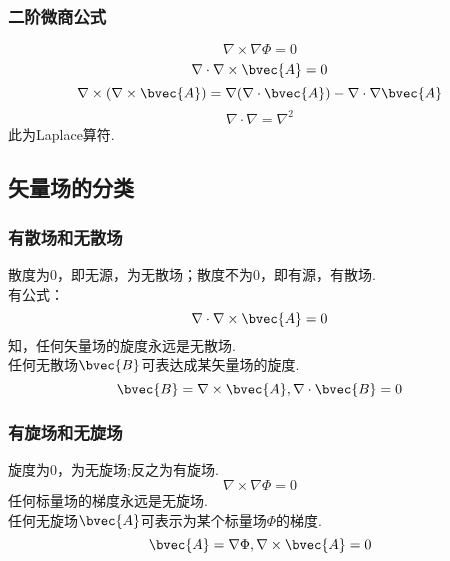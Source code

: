 \subsubsection{二阶微商公式}
\begin{equation}\label{VecAnl_eq20}
\nabla\times\nabla\Phi=0
\end{equation}
\begin{equation}\label{VecAnl_eq21}
\nabla\cdot\nabla\times\bvec{A}=0
\end{equation}
\begin{equation}\label{VecAnl_eq22}
\nabla\times(\nabla\times\bvec{A})=\nabla(\nabla\cdot\bvec{A})-\nabla\cdot\nabla\bvec{A}
\end{equation}
\begin{equation}\label{VecAnl_eq23}
\nabla\cdot\nabla=\nabla^2
\end{equation}
此为Laplace算符.

\subsection{矢量场的分类}
\subsubsection{有散场和无散场}
散度为0，即无源，为无散场；散度不为0，即有源，有散场.\\
有公式：
\begin{equation}\label{VecAnl_eq24}
\nabla\cdot\nabla\times\bvec{A}=0
\end{equation}
知，任何矢量场的旋度永远是无散场.\\
任何无散场$\bvec{B}$可表达成某矢量场的旋度.
\begin{equation}\label{VecAnl_eq25}
\bvec{B}=\nabla\times\bvec{A} ,\nabla\cdot\bvec{B}=0
\end{equation}
\subsubsection{有旋场和无旋场}
旋度为0，为无旋场;反之为有旋场.
\begin{equation}\label{VecAnl_eq26}
\nabla\times\nabla\Phi=0
\end{equation}
任何标量场的梯度永远是无旋场.\\
任何无旋场$\bvec{A}$可表示为某个标量场$\Phi$的梯度.
\begin{equation}\label{VecAnl_eq27}
\bvec{A}=\nabla\Phi,\nabla\times\bvec{A}=0
\end{equation}

